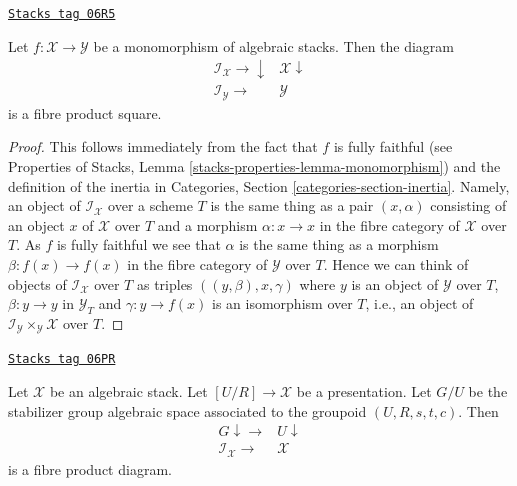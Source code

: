 \begin{lemma}
\label{stacks-morphisms-lemma-monomorphism-cartesian-square-inertia}
\href{https://stacks.math.columbia.edu/tag/06R5}{\texttt{Stacks tag 06R5}}

Let $f : \mathcal{X} \to \mathcal{Y}$ be a monomorphism of algebraic stacks.
Then the diagram
$$
\begin{array}{cc}\mathcal{I}_\mathcal{X} \longrightarrow\downarrow & \mathcal{X} \downarrow \\ \mathcal{I}_\mathcal{Y} \longrightarrow & \mathcal{Y}\end{array}
$$
is a fibre product square.
\end{lemma}

\begin{proof}
This follows immediately from the fact that $f$ is fully faithful (see
Properties of Stacks, Lemma \ref{stacks-properties-lemma-monomorphism})
and the definition of the inertia in
Categories, Section \ref{categories-section-inertia}.
Namely, an object of $\mathcal{I}_\mathcal{X}$ over a scheme $T$ is
the same thing as a pair $(x, \alpha)$ consisting of an object
$x$ of $\mathcal{X}$ over $T$ and a morphism $\alpha : x \to x$ in
the fibre category of $\mathcal{X}$ over $T$. As $f$ is fully faithful
we see that $\alpha$ is the same thing as a morphism
$\beta : f(x) \to f(x)$ in the fibre category of $\mathcal{Y}$ over $T$.
Hence we can think of objects of $\mathcal{I}_\mathcal{X}$ over $T$
as triples $((y, \beta), x, \gamma)$ where $y$ is an object of
$\mathcal{Y}$ over $T$, $\beta : y \to y$ in $\mathcal{Y}_T$ and
$\gamma : y \to f(x)$ is an isomorphism over $T$, i.e., an object
of $\mathcal{I}_\mathcal{Y} \times_\mathcal{Y} \mathcal{X}$ over $T$.
\end{proof}

\begin{lemma}
\label{stacks-morphisms-lemma-presentation-inertia}
\href{https://stacks.math.columbia.edu/tag/06PR}{\texttt{Stacks tag 06PR}}

Let $\mathcal{X}$ be an algebraic stack. Let $[U/R] \to \mathcal{X}$
be a presentation. Let $G/U$ be the stabilizer group algebraic space
associated to the groupoid $(U, R, s, t, c)$. Then
$$
\begin{array}{cc}G \downarrow\longrightarrow & U \downarrow \\ \mathcal{I}_\mathcal{X} \longrightarrow & \mathcal{X}\end{array}
$$
is a fibre product diagram.
\end{lemma}

